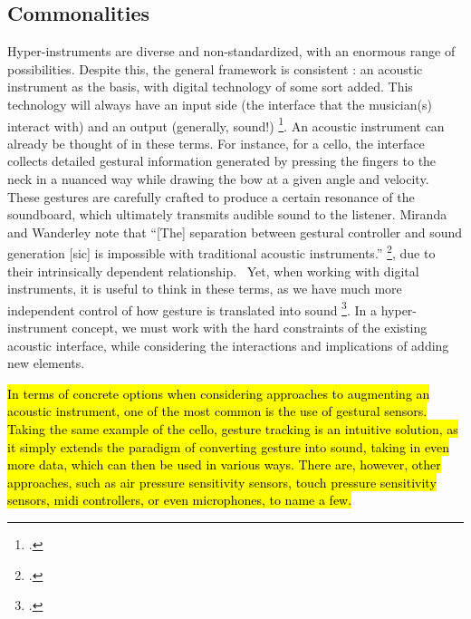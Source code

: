 \documentclass[12pt,twoside,maitrise]{dms_ks}
\theoremstyle{definition}
\begin{document}
\subsection{Commonalities}

Hyper-instruments are diverse and non-standardized, with an enormous range of possibilities.  
Despite this, the general framework is consistent : an acoustic instrument as the basis, with digital technology of some sort added. 
This technology will always have an input side (the interface that the musician(s) interact with) and an output (generally, sound!) \footcite[3]{miranda_new_2006}. 
An acoustic instrument can already be thought of in these terms.
For instance, for a cello, the interface collects detailed gestural information generated by pressing the fingers to the neck in a nuanced way while drawing the bow at a given angle and velocity. 
These gestures are carefully crafted to produce a certain resonance of the soundboard, which ultimately transmits audible sound to the listener. 
Miranda and Wanderley note that “[The] separation between gestural controller and sound generation [sic] is impossible with traditional acoustic instruments.” \footcite[3]{miranda_new_2006}, due to their intrinsically dependent relationship.~
Yet, when working with digital instruments, it is useful to think in these terms, as we have much more independent control of how gesture is translated into sound \footcite[24--25]{jorda_digital_2005}.
In a hyper-instrument concept, we must work with the hard constraints of the existing acoustic interface, while considering the interactions and implications of adding new elements. 

\hl{In terms of concrete options when considering approaches to augmenting an acoustic instrument, one of the most common is the use of gestural sensors. 
Taking the same example of the cello, gesture tracking is an intuitive solution, as it simply extends the paradigm of converting gesture into sound, taking in even more data, which can then be used in various ways. 
There are, however, other approaches, such as air pressure sensitivity sensors, touch pressure sensitivity sensors, midi controllers, or even microphones, to name a few.} 
\end{document}
